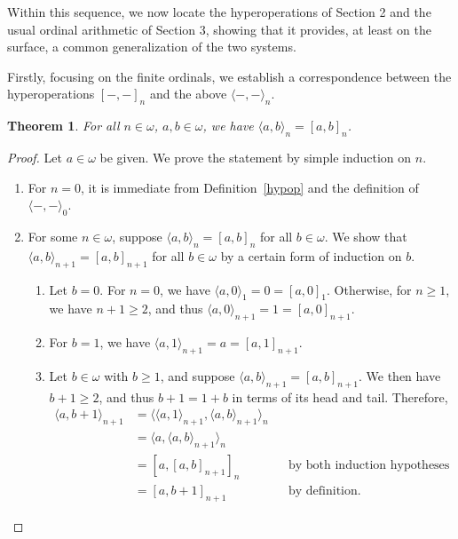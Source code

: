 \documentclass[12pt, a4paper]{article}
\newtheorem{theorem}{Theorem}[section]
\theoremstyle{definition}
\theoremstyle{remark}
\newcommand{\op}[2]{\langle#1, #2\rangle}
\begin{document}
Within this sequence, we now locate the hyperoperations of Section 2 and the usual ordinal arithmetic of Section 3, showing that it provides, at least on the surface, a common generalization of the two systems.

Firstly, focusing on the finite ordinals, we establish a correspondence between the hyperoperations $[-,-]_n$ and the above $\op--_n$.

\begin{theorem}
    For all $n\in\omega$, $a, b \in \omega$, we have $\langle a, b \rangle_n = [a, b]_n$.
\end{theorem}

\begin{proof}
    Let $a\in\omega$ be given. We prove the statement by simple induction on $n$.
    \begin{enumerate}
        \item[(i)] For $n=0$, it is immediate from Definition~\ref{hypop} and the definition of $\op--_0$.
        \item[(ii)] For some $n\in\omega$, suppose $\langle a, b \rangle_n = [a, b]_n$ for all $b\in\omega$. We show that $\op ab_{n+1} = [a, b]_{n+1}$ for all $b \in \omega$ by a certain form of induction on $b$.
        \begin{enumerate}
            \item[(1)] Let $b = 0$. For $n = 0$, we have $\op a0_1 = 0 = [a, 0]_1$. Otherwise, for $n \geq 1$, we have $n+1 \geq 2$, and thus $\op a0_{n+1} = 1 = [a, 0]_{n+1}$.
            \item[(2)] For $b = 1$, we have $\op a1_{n+1} = a = [a, 1]_{n+1}$.
            \item[(3)] Let $b\in\omega$ with $b\geq1$, and suppose $\op ab_{n+1} = [a, b]_{n+1}$. We then have $b+1 \geq 2$, and thus $b+1 = 1+b$ in terms of its head and tail. Therefore,
            \begin{align*}
                \op a{b+1}_{n+1} &= \op{\op a1_{n+1}}{\op ab_{n+1}}_n && \\
                &= \op a{\op ab_{n+1}}_n && \\
                &= [a, [a, b]_{n+1}]_n && \text{by both induction hypotheses} \\
                &= [a, b+1]_{n+1} && \text{by definition.}
            \end{align*}
        \end{enumerate}
    \end{enumerate}
\end{proof}
\end{document}
